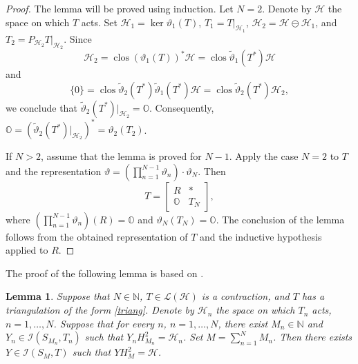 \documentclass[a4paper,oneside,11pt]{amsart}
\numberwithin{equation}{section}
\theoremstyle{plain}
\newtheorem{lemma}[theorem]{Lemma}
\theoremstyle{definition}
\begin{document}
\begin{proof} The lemma will be proved using induction. Let $N=2$. Denote by $\mathcal H$ the space on which $T$ acts. 
Set $\mathcal H_1=\ker\vartheta_1(T)$, $T_1=T|_{\mathcal H_1}$,
 $\mathcal H_2=\mathcal H\ominus\mathcal H_1$, and $T_2=P_{\mathcal H_2}T|_{\mathcal H_2}$.  
Since 
\begin{equation*}\mathcal H_2=\operatorname{clos}(\vartheta_1(T))^*\mathcal H
=\operatorname{clos}\widetilde\vartheta_1(T^*)\mathcal H
\end{equation*} 
and 
\begin{equation*} \{0\}=\operatorname{clos}\widetilde\vartheta_2(T^*)\widetilde\vartheta_1(T^*)\mathcal H =
\operatorname{clos}\widetilde\vartheta_2(T^*)\mathcal H_2,
\end{equation*} 
we conclude that $\widetilde\vartheta_2(T^*)|_{\mathcal H_2}=\mathbb O$. Consequently,  
$\mathbb O= (\widetilde\vartheta_2(T^*)|_{\mathcal H_2})^*=\vartheta_2(T_2)$. 

If $N>2$, assume that the lemma is proved for $N-1$. Apply the case $N=2$ to  $T$ and  the representation  
 $\vartheta=(\prod_{n=1}^{N-1}\vartheta_n)\cdot\vartheta_N$. 
Then \begin{equation*} T= \left[ \begin{matrix} R  & * \\ \mathbb O & T_N
 \end{matrix}\right], 
\end{equation*} 
where $(\prod_{n=1}^{N-1}\vartheta_n)(R)=\mathbb O$ and $\vartheta_N(T_N)=\mathbb O$. 
The conclusion of the lemma follows from the obtained representation of $T$ and  the inductive hypothesis applied to $R$. 
\end{proof}

The proof of the following lemma is based on {\cite[Lemma 1]{takshift}}.

\begin{lemma} \label{lemisometry}  Suppose that $N\in\mathbb N$, 
  $T\in\mathcal L(\mathcal H)$ is a contraction, and $T$ has a triangulation of the form \eqref{triang}. 
Denote by $\mathcal H_n$ the space on which $T_n$ acts, $n=1,\ldots, N$. 
Suppose that for every $n$, $n=1,\ldots, N$, there exist $M_n\in\mathbb N$ and  
  $Y_n\in\mathcal I(S_{M_n},T_n)$ such that $Y_n H^2_{M_n}=\mathcal H_n$. Set $M=\sum_{n=1}^N M_n$. 
Then there exists 
$Y\in\mathcal I(S_M,T)$ such that $Y H^2_M=\mathcal H$. 
\end{lemma}
\end{document}
